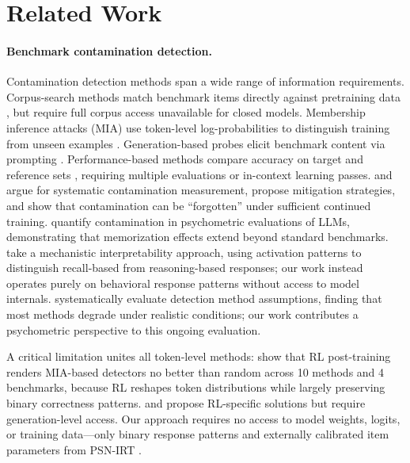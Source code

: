 \section{Related Work}\label{sec:related_work}

\paragraph{Benchmark contamination detection.}
Contamination detection methods span a wide range of information requirements.
Corpus-search methods match benchmark items directly against pretraining data \citep{dodge2021, magar2022}, but require full corpus access unavailable for closed models.
Membership inference attacks (MIA) use token-level log-probabilities to distinguish training from unseen examples \citep{minkprob2024, deng2024}.
Generation-based probes elicit benchmark content via prompting \citep{golchin2024, golchin2024quiz, oren2024}.
Performance-based methods compare accuracy on target and reference sets \citep{constat2024, pacost2024, codec2026}, requiring multiple evaluations or in-context learning passes.
\citet{zhou2023benchmark} and \citet{sainz2023} argue for systematic contamination measurement, \citet{jacovi2023} propose mitigation strategies, and \citet{bordt2025forget} show that contamination can be ``forgotten'' under sufficient continued training.
\citet{han2026quantifying} quantify contamination in psychometric evaluations of LLMs, demonstrating that memorization effects extend beyond standard benchmarks.
\citet{kattamuri2025radar} take a mechanistic interpretability approach, using activation patterns to distinguish recall-based from reasoning-based responses; our work instead operates purely on behavioral response patterns without access to model internals.
\citet{fu2025contamination} systematically evaluate detection method assumptions, finding that most methods degrade under realistic conditions; our work contributes a psychometric perspective to this ongoing evaluation.

A critical limitation unites all token-level methods: \citet{wang2025fragility} show that RL post-training renders MIA-based detectors no better than random across 10 methods and 4 benchmarks, because RL reshapes token distributions while largely preserving binary correctness patterns.
\citet{selfcritique2026} and \citet{zhang2026rlvr} propose RL-specific solutions but require generation-level access.
Our approach requires no access to model weights, logits, or training data---only binary response patterns and externally calibrated item parameters from PSN-IRT \citep{psnirt2026}.


